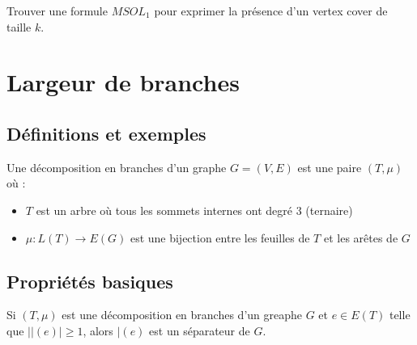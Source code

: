 \documentclass[a4paper, 11pt]{report}
\begin{document}
\begin{exo}
    Trouver une formule $MSOL_1$ pour exprimer la présence d'un vertex cover de taille $k$.

\section{Largeur de branches}

\subsection{Définitions et exemples}

\begin{df}
    Une décomposition en branches d'un graphe $G=(V,E)$ est une paire $(T, \mu)$ où :
    \begin{itemize}
        \item $T$ est un arbre où tous les sommets internes ont degré $3$ (ternaire)
        \item $\mu : L(T) \rightarrow E(G)$ est une bijection entre les feuilles de $T$ et les
            arêtes de $G$
    \end{itemize}
\end{df}


\subsection{Propriétés basiques}

\begin{prop}
    Si $(T, \mu)$ est une décomposition en branches d'un greaphe $G$ et $e \in E(T)$ telle que
    $|\mid(e)| \geq 1$, alors $\mid(e)$ est un séparateur de $G$.
\end{prop}


\end{exo}
\end{document}
